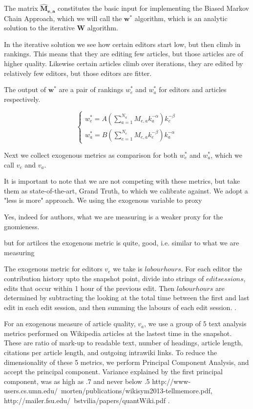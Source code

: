 \documentclass{acm_proc_article-sp}
\begin{document}
The matrix $\mathbf{\hat{M}_{e,a}}$ constitutes the basic input for implementing the Biased Markov Chain Approach, which we will call the $\mathbf{w^*}$ algorithm, which is an analytic solution to the iterative $\mathbf{W}$ algorithm. \cite{Caldarelli} 

In the iterative solution we see how certain editors start low, but then climb in rankings. This means that they are editing few articles, but those articles are of higher quality. Likewise certain articles climb over iterations, they are edited by relatively few editors, but those editors are fitter.

The output of $\mathbf{w^*}$ are a pair of rankings $ w^*_e$ and $ w^*_a$ for editors and articles respectively.

\begin{equation}
\begin{cases}
w^*_e = A(\sum^{N_a}_{a=1} M_{e,a}k_a^{-\alpha})k_e^{-\beta} \\
w^*_a = B(\sum^{N_e}_{e=1} M_{e,a}k_e^{-\beta})k_a^{-\alpha}
\end{cases}
\end{equation}

Next we collect exogenous metrics as comparison for both  $w^{*}_{e}$ and $w^{*}_{a}$, which we call  $v_e$ and $v_a$.

It is important to note that we are not competing with these metrics, but take them as state-of-the-art, Grand Truth, to which we calibrate against. We adopt a "less is more" approach. We using the exogenous variable to proxy 

Yes, indeed for authors, what we are measuring is a weaker proxy for the gnomieness.

but for artilces the exogenous metric is quite, good, i.e. similar to what we are measuring

The exogenous metric for editors $v_e$ we take is $labour hours$. For each editor the contribution history upto the snapshot point,  divide into strings of $edit sessions$, edits that occur within 1 hour of the previous edit. Then $labour hours$ are determined by subtracting the looking at the total time between the first and last edit in each edit session, and then summing the labours of each edit session. \cite{Geiger, Halfaker}. 

For an exogenous measure of article quality, $ v_a$,  we use a group of 5 text analysis metrics performed on Wikipedia articles at the lastest time in the snapshot. These are ratio of mark-up to readable text, number of headings, article length, citations per article length, and outgoing intrawiki links. To reduce the dimensionality of these 5 metrics, we perform Principal Component Analysis, and accept the principal component. Variance explained by the first principal component, was as high as .7 and never below .5 http://www-users.cs.umn.edu/~morten/publications/wikisym2013-tellmemore.pdf, http://mailer.fsu.edu/~bstvilia/papers/quantWiki.pdf \cite{ Morten}.
\end{document}

